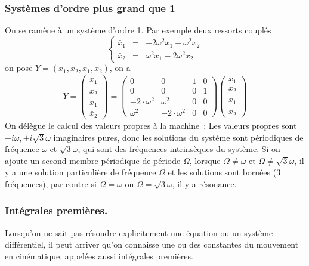 \documentclass[a4paper,11pt]{article}
\begin{document}
\begin{giacjshere}
\subsubsection{Syst\`emes d'ordre plus grand que 1}
On se ram\`ene \`a un syst\`eme d'ordre 1.
Par exemple deux ressorts coupl\'es
$$ 
\left\{ 
\begin{array}{ccc}
\ddot{x_1}&=&-2\omega^2 x_1+\omega^2 x_2\\
\ddot{x_2}&=&\omega^2 x_1-2\omega^2x_2
\end{array}
\right. $$
on pose $Y=(x_1,x_2,\dot{x_1},\dot{x_2})$, on a
$$\dot{Y}=\left(
\begin{array}{c}\dot{x_1}\\\dot{x_2}\\\ddot{x_1}\\\ddot{x_2}\end{array}
\right)
=\left(\begin{array}{cccc}
0 & 0 & 1 & 0 \\
0 & 0 & 0 & 1 \\
-2\cdot \omega^{2} & \omega^{2} & 0 & 0 \\
\omega^{2} & -2\cdot \omega^{2} & 0 & 0
\end{array}\right) 
\left(
\begin{array}{c}x_1\\x_2\\\dot{x_1}\\\dot{x_2}\end{array}
\right)
$$ 
On d\'el\`egue le calcul des valeurs propres \`a la machine~:
Les valeurs propres sont $\pm i \omega, \pm i\sqrt{3} \omega$ imaginaires
pures, donc les solutions du syst\`eme sont p\'eriodiques
de fr\'equence $\omega$ et $\sqrt{3}\omega$, qui sont des fr\'equences
intrins\`eques du syst\`eme. Si on ajoute un second membre
p\'eriodique de p\'eriode $\Omega$, lorsque $\Omega \neq \omega$ et 
$\Omega \neq \sqrt{3}\omega$, il y a une solution particuli\`ere
de fr\'equence $\Omega$ et les solutions sont born\'ees (3 fr\'equences),
par contre si $\Omega=\omega$ ou $\Omega=\sqrt{3}\omega$, il y a r\'esonance.

\subsubsection{Int\'egrales premi\`eres.}
Lorsqu'on ne sait pas r\'esoudre explicitement une \'equation
ou un syst\`eme diff\'erentiel, il peut arriver qu'on connaisse
une ou des constantes du mouvement en cin\'ematique, appel\'ees
aussi int\'egrales premi\`eres. 


\end{giacjshere}
\end{document}
